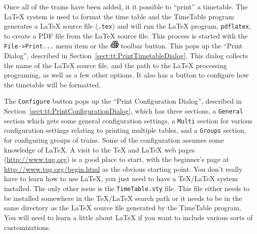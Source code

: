 Once all of the trains have been added, it it possible to ``print'' a
timetable.  The LaTeX system is used to format the time table and the
TimeTable program generates a \LaTeX{} source file (\verb=.tex=) and will
run the \LaTeX{} program, \verb=pdflatex=, to create a PDF file from the
\LaTeX{} source file.  This process is started with the
\verb=File->Print...= menu item or the
\includegraphics{TTprintTool.png} toolbar button.  This pops up the
``Print Dialog'', described in Section~\ref{sect:tt:PrintTimetableDialog}.
This dialog collects the name of the \LaTeX{} source file, and the path to the
\LaTeX{} processing programing, as well as a few other options.  It also
has a button to configure how the timetable will be formatted.  

The \verb=Configure= button pops up the ``Print Configuration Dialog'',
described in Section~\ref{sect:tt:PrintConfigurationDialog}, which has
three sections, a \verb=General= section which gets some general
configuration settings, a \verb=Multi= section for various
configuration settings relating to printing multiple tables, and a
\verb=Groups= section, for configuring groups of trains.  Some of the
configuration assumes some knowledge of \LaTeX. A visit to the \TeX{} and
\LaTeX{} web pages (\url{http://www.tug.org}) is a good place to start,
with the beginner's page at \url{http://www.tug.org/begin.html} as the
obvious starting point.  You don't really have to learn how to use
\LaTeX{}, you just need to have a \TeX/\LaTeX{} system installed.  The only
other issue is the \verb=TimeTable.sty= file.  This file either needs to be
installed somewhere in the \TeX/\LaTeX{} search path or it needs to be in
the same directory as the \LaTeX{} source file generated by the TimeTable
program. You will need to learn a little about \LaTeX{} if you want to
include various sorts of customizations.
